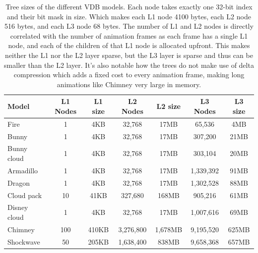 \begin{table}[htbp]
    \centering
    \begin{tabularx}{\textwidth}{|X|c|c|c|c|c|c|}
        \hline
        \textbf{Model} & \textbf{L1 Nodes} & \textbf{L1 size} & \textbf{L2 Nodes} & \textbf{L2 size} & \textbf{L3 Nodes} & \textbf{L3 size} \\
        \hline
        Fire           & 1                 & 4KB              & 32,768            & 17MB             & 65,536            & 4MB              \\
        \hline
        Bunny          & 1                 & 4KB              & 32,768            & 17MB             & 307,200           & 21MB             \\
        \hline
        Bunny cloud    & 1                 & 4KB              & 32,768            & 17MB             & 303,104           & 20MB             \\
        \hline
        Armadillo      & 1                 & 4KB              & 32,768            & 17MB             & 1,339,392         & 91MB             \\
        \hline
        Dragon         & 1                 & 4KB              & 32,768            & 17MB             & 1,302,528         & 88MB             \\
        \hline
        Cloud pack     & 10                & 41KB             & 327,680           & 168MB            & 905,216           & 61MB             \\
        \hline
        Disney cloud   & 1                 & 4KB              & 32,768            & 17MB             & 1,007,616         & 69MB             \\
        \hline
        Chimney        & 100               & 410KB            & 3,276,800         & 1,678MB          & 9,195,520         & 625MB            \\
        \hline
        Shockwave      & 50                & 205KB            & 1,638,400         & 838MB            & 9,658,368         & 657MB            \\
        \hline
    \end{tabularx}
    \caption{Tree sizes of the different VDB models. Each node takes exactly one 32-bit index and their bit mask in size. Which makes each L1 node 4100 bytes, each L2 node 516 bytes, and each L3 node 68 bytes. The number of L1 and L2 nodes is directly correlated with the number of animation frames as each frame has a single L1 node, and each of the children of that L1 node is allocated upfront. This makes neither the L1 nor the L2 layer sparse, but the L3 layer is sparse and thus can be smaller than the L2 layer. It's also notable how the trees do not make use of delta compression which adds a fixed cost to every animation frame, making long animations like Chimney very large in memory.}
    \label{tab:tree_sizes}
\end{table}

